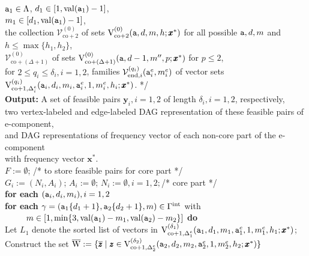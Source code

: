 \documentclass[12pt]{article}
\newcommand{\intt}{\mathrm{int}}
\newcommand{\co}{\mathrm{co}}
\newcommand{\V}{{\rm V}}
\newcommand{\ta}{{\tt a}}
\newcommand{\y}{\pmb{y}}
\newcommand{\x}{\pmb{x}}
\newcommand{\z}{\pmb{z}}
\newcommand{\1}{\pmb{1}}
\newcommand{\0}{\pmb{0}}
\newcommand{\val}{\mathrm{val}}
\newcommand{\en}{\mathrm{end}}
\newcommand{\W}{\mathrm{W}}
\newcommand{\Vv}{\mathcal{V}}
\begin{document}
\begin{tabbing}
                  $\ta_1 \in \Lambda$,
                  $d_1 \in [1, \val(\ta_1)-1]$, \\
                  $m_1 \in [d_1, \val(\ta_1) - 1]$,\\
                  the collection $\Vv_{\co+2}^{(0)}$ of sets 
                 $\V_{\co+2}^{(0)}(\ta, d , 
                 m, h; \x^*)$
                  for all possible $\ta, d, m$ and 
                  $h \leq \max\{h_1, h_2\}$,\\
                  $\Vv_{\co+(\Delta + 1)}^{(0)}$ of sets 
                 $\V_{\co+(\Delta + 1)}^{(0)}(\ta, d -1, 
                 m'', p; \x^*)$
                  for $p \leq 2$,\\
                  for $2 \leq q_i \leq \delta_i, i=1, 2$, 
                 families $\Vv_{\en, i}^{(q_i)}(\ta^e_i, m^e_i)$ 
                 of vector sets  
                 $\V_{\co+1, \Delta_i^e}^{(q_i)}
                (\ta_i,d_i, m_i, \ta_i^e, 1,m_i^e, h_i; \x^* )$.             
                  */ \- \\
{\bf Output:} A set of feasible pairs $\y_i, i=1, 2$ of length 
$\delta_i, i = 1, 2$, respectively, \+ \\
two vertex-labeled and edge-labeled DAG representation of 
these feasible pairs of e-component, \\
and DAG representations of 
frequency vector of each non-core part of the e-component\\ 
with frequency vector $\x^*$. \- \\
%
$F:= \emptyset$; /* to store feasible pairs for core part */\\
$G_i := (N_i, A_i)$; $A_i:= \emptyset$; 
$N_i:= \emptyset, i = 1, 2;$/*  core part */\\
{\bf for each} $(\ta_i,d_i, m_i), i = 1, 2$\+ \\
{\bf for each} $\gamma=(\ta_1\{d_1+1\}, \ta_2\{d_2+1\}, m) \in \Gamma^{\intt}$
 with \\
 ~~~~~$m \in [1, \min\{3, \val(\ta_1)-m_1, \val(\ta_2)-m_2\}]$   {\bf do} \+ \\
 Let
   $L_1$ denote the sorted  list of vectors in 
   $\V_{\co+1, \Delta_1^e}^{(\delta_1)}
                (\ta_1,d_1, m_1, \ta_1^e, 1,m_1^e, h_1; \x^* )$; \\
 Construct the set $\overline{\W}:=
 \{\overline{\z} \mid \z \in \V_{\co+1, \Delta_2^e}^{(\delta_2)}
                (\ta_2,d_2, m_2, \ta_2^e, 1,m_2^e, h_2; \x^* )\}$

\end{tabbing}
\end{document}
